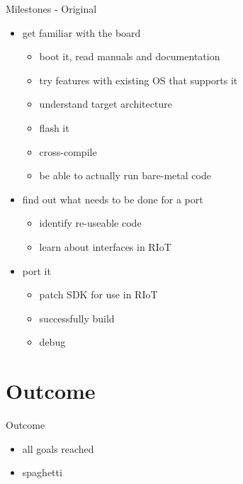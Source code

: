 \documentclass[9pt]{beamer}
\begin{document}
\begin{frame}{Milestones - Original}
 \begin{itemize}
 \item get familiar with the board
 	\begin{itemize}
 	\item boot it, read manuals and documentation
 	\item try features with existing OS that supports it
 	\item understand target architecture
 	\item flash it
 	\item cross-compile
 	\item be able to actually run bare-metal code
 	\end{itemize}
 \item find out what needs to be done for a port
 	\begin{itemize}
 	\item identify re-useable code
 	\item learn about interfaces in RIoT
 	\end{itemize}
 \item port it
 	\begin{itemize}
 	\item patch SDK for use in RIoT
 	\item successfully build
 	\item debug
 	\end{itemize}
 \end{itemize}
\end{frame}


\section{Outcome}

\begin{frame}{Outcome}
\pause
 \begin{itemize}
  \item all goals reached
\pause
 	\item spaghetti
 \end{itemize}
\end{frame}
\end{document}
